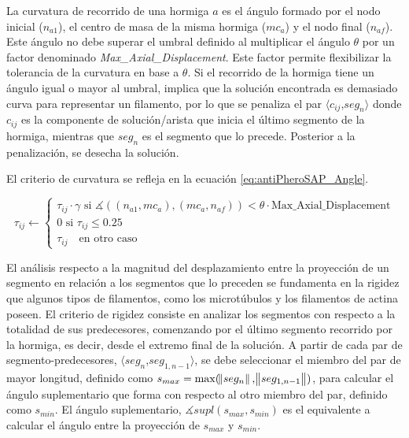 La curvatura de recorrido de una hormiga $a$ es el \'angulo formado por el nodo inicial ($n_{a1}$), el centro de masa de la misma hormiga ($mc_{a}$) y el nodo final ($n_{af}$). Este \'angulo no debe superar el umbral definido al multiplicar el \'angulo $\theta$ por un factor denominado {\it Max\_Axial\_Displacement}. Este factor permite flexibilizar la tolerancia de la curvatura en base a $\theta$. Si el recorrido de la hormiga tiene un \'angulo igual o mayor al umbral, implica que la soluci\'on encontrada es demasiado curva para representar un filamento, por lo que se penaliza el par $\langle c_{ij}$,$ seg_{n}\rangle$ donde $c_{ij}$ es la componente de soluci\'on/arista que inicia el \'ultimo segmento de la hormiga, mientras que $seg_{n}$ es el segmento que lo precede. Posterior a la penalizaci\'on, se desecha la soluci\'on.

El criterio de curvatura se refleja en la ecuaci\'on \eqref{eq:antiPheroSAP_Angle}.

\begin{equation}
    \tau_{ij} \leftarrow
        \begin{cases}
        \tau_{ij} \cdot \gamma \text{ si } \measuredangle((n_{a1}, mc_{a}), (mc_{a}, n_{af})) < \theta \cdot \text{Max\_Axial\_Displacement}\\[3ex]
        
        \text{0 si } \tau_{ij} \leq 0.25 \\[3ex]
        \tau_{ij} \quad \text{en otro caso}
        \end{cases}
    \label{eq:antiPheroSAP_Angle}
\end{equation}

El an\'alisis respecto a la magnitud del desplazamiento entre la proyecci\'on de un segmento en relaci\'on a los segmentos que lo preceden se fundamenta en la rigidez que algunos tipos de filamentos, como los microt\'ubulos y los filamentos de actina poseen\cite{stam2017filament}. El criterio de rigidez consiste en analizar los segmentos con respecto a la totalidad de sus predecesores, comenzando por el \'ultimo segmento recorrido por la hormiga, es decir, desde el extremo final de la soluci\'on. A partir de cada par de segmento-predecesores, $\langle seg_{n}$,$seg_{1,n-1}\rangle$, se debe seleccionar el miembro del par de mayor longitud, definido como $s_{max} = \max(\norm{seg_{n}}, \norm{seg_{1,n-1}})$, para calcular el \'angulo suplementario que forma con respecto al otro miembro del par, definido como $s_{min}$. El \'angulo suplementario, $\measuredangle supl(s_{max},s_{min})$ es el equivalente a calcular el \'angulo entre la proyecci\'on de $s_{max}$ y $s_{min}$.

